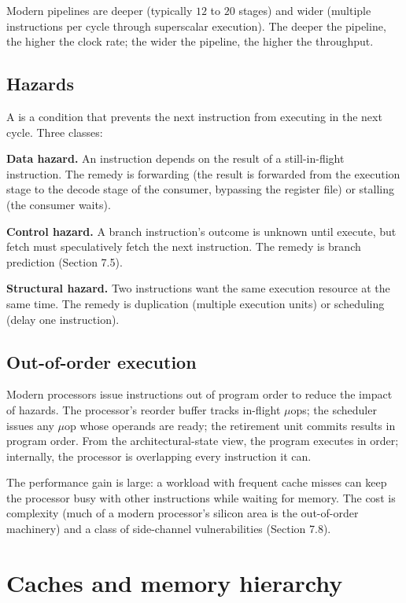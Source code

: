 Modern pipelines are deeper (typically $12$ to $20$ stages) and wider (multiple instructions per cycle through superscalar execution). The deeper the pipeline, the higher the clock rate; the wider the pipeline, the higher the throughput.

\subsection{Hazards}

A  is a condition that prevents the next instruction from executing in the next cycle. Three classes:

\textbf{Data hazard.} An instruction depends on the result of a still-in-flight instruction. The remedy is forwarding (the result is forwarded from the execution stage to the decode stage of the consumer, bypassing the register file) or stalling (the consumer waits).

\textbf{Control hazard.} A branch instruction's outcome is unknown until execute, but fetch must speculatively fetch the next instruction. The remedy is branch prediction (Section 7.5).

\textbf{Structural hazard.} Two instructions want the same execution resource at the same time. The remedy is duplication (multiple execution units) or scheduling (delay one instruction).

\subsection{Out-of-order execution}

Modern processors issue instructions out of program order to reduce the impact of hazards. The processor's reorder buffer tracks in-flight $\mu$ops; the scheduler issues any $\mu$op whose operands are ready; the retirement unit commits results in program order. From the architectural-state view, the program executes in order; internally, the processor is overlapping every instruction it can.

The performance gain is large: a workload with frequent cache misses can keep the processor busy with other instructions while waiting for memory. The cost is complexity (much of a modern processor's silicon area is the out-of-order machinery) and a class of side-channel vulnerabilities (Section 7.8).

\section{Caches and memory hierarchy}

